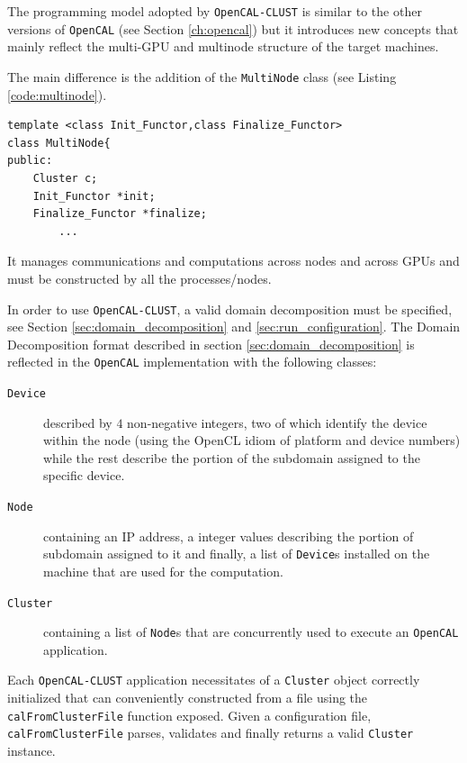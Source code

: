 The programming model adopted by \texttt{OpenCAL-CLUST}  is similar to the other versions of \texttt{OpenCAL} (see Section \ref{ch:opencal}) but it introduces new concepts that mainly reflect the multi-GPU and multinode structure of the target machines.

The main difference is the addition of the \texttt{MultiNode} class (see Listing \ref{code:multinode}).
\begin{lstlisting}
template <class Init_Functor,class Finalize_Functor>
class MultiNode{
public:
    Cluster c;
    Init_Functor *init;
    Finalize_Functor *finalize;
        ...
\end{lstlisting}
It manages communications and computations across nodes and across GPUs and must be constructed by all the processes/nodes.

In order to use \texttt{OpenCAL-CLUST}, a valid domain decomposition must be specified, see Section \ref{sec:domain_decomposition} and \ref{sec:run_configuration}.
The Domain Decomposition format described in section \ref{sec:domain_decomposition} is reflected in the \texttt{OpenCAL} implementation with the following classes:
\begin{description}
    \item[\texttt{Device}] described by $4$ non-negative integers, two of which identify the device  within the node (using the OpenCL idiom of platform and device numbers) while the rest describe the portion of the subdomain assigned to the specific device.
    \item[\texttt{Node}] containing an IP address, a integer values describing the portion of subdomain assigned to it and finally, a list of \texttt{Device}s installed on the machine that are used for the computation.
    \item [\texttt{Cluster}] containing a list of \texttt{Node}s that are concurrently used to  execute an \texttt{OpenCAL} application.
\end{description}
Each \texttt{OpenCAL-CLUST}  application necessitates of a \texttt{Cluster} object correctly initialized that can conveniently constructed from a file using the \texttt{calFromClusterFile} function exposed. Given a configuration file, \texttt{calFromClusterFile} parses, validates and finally returns a valid \texttt{Cluster} instance.

